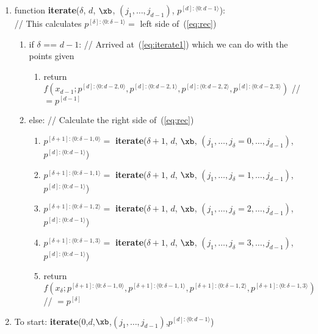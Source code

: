 \documentclass[11pt]{article}
\begin{document}
\begin{enumerate}
\item function \textbf{iterate}($\delta$, $d$, $\xb$, $(j_1, \dots, j_{d-1})$, $p^{[d]:\langle 0:d-1 \rangle}$): \\
// This calculates $p^{[\delta]: \langle 0:\delta-1 \rangle} = $ left side of~(\ref{eq:rec})
\begin{enumerate}
\item if $\delta$ == $d-1$: // Arrived at~(\ref{eq:iterate1}) which we can do with the points given
\begin{enumerate}
\item return $f \left ( 
x_{d-1} ; 
p^{[d]: \langle 0:d-2,0 \rangle},
p^{[d]: \langle 0:d-2,1 \rangle},
p^{[d]: \langle 0:d-2,2 \rangle},
p^{[d]: \langle 0:d-2,3 \rangle}
\right )$ // $= p^{[d-1]}$
\end{enumerate}
\item else: // Calculate the right side of~(\ref{eq:rec})
\begin{enumerate}
\item $p^{[\delta+1]: \langle 0: \delta-1,0 \rangle} = $ \textbf{iterate}($\delta+1$, $d$, $\xb$, $( j_1, \dots, j_{\delta}=0, \dots, j_{d-1} )$, $p^{[d]:\langle 0:d-1 \rangle}$)
\item $p^{[\delta+1]: \langle 0: \delta-1,1 \rangle} = $ \textbf{iterate}($\delta+1$, $d$, $\xb$, $( j_1, \dots, j_{\delta}=1, \dots, j_{d-1} )$, $p^{[d]:\langle 0:d-1 \rangle}$)
\item $p^{[\delta+1]: \langle 0: \delta-1,2 \rangle} = $ \textbf{iterate}($\delta+1$, $d$, $\xb$, $( j_1, \dots, j_{\delta}=2, \dots, j_{d-1} )$, $p^{[d]:\langle 0:d-1 \rangle}$)
\item $p^{[\delta+1]: \langle 0: \delta-1,3 \rangle} = $ \textbf{iterate}($\delta+1$, $d$, $\xb$, $( j_1, \dots, j_{\delta}=3, \dots, j_{d-1} )$, $p^{[d]:\langle 0:d-1 \rangle}$)
\item return $f \left ( 
x_{\delta} ; 
p^{[\delta+1]: \langle 0:\delta-1,0 \rangle},
p^{[\delta+1]: \langle 0:\delta-1,1 \rangle},
p^{[\delta+1]: \langle 0:\delta-1,2 \rangle},
p^{[\delta+1]: \langle 0:\delta-1,3 \rangle}
\right ) $ // $= p^{[\delta]}$
\end{enumerate}
\end{enumerate}

\item To start: \textbf{iterate}(0,$d$,$\xb$,$(j_1,\dots,j_{d-1})$,$p^{[d]:\langle 0:d-1 \rangle}$)
\end{enumerate}
\end{document}
